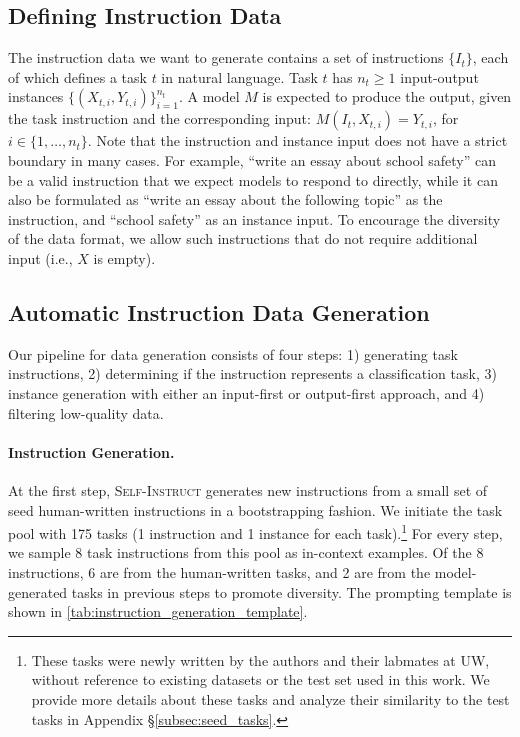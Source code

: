 \documentclass[11pt]{article}
\newcommand{\name}{\textsc{Self-Instruct}}
\begin{document}
\subsection{Defining Instruction Data}
\label{subsec:instruction-data-definition}

The instruction data we want to generate contains a set of instructions $\{I_t\}$, each of which defines a task $t$ in natural language. Task $t$ has $n_t \ge 1$ input-output instances $\{(X_{t,i}, Y_{t,i})\}_{i=1}^{n_t}$.
A model $M$ is expected to produce the output, given the task instruction and the corresponding input: $M(I_t, X_{t,i}) = Y_{t,i}$, for $i \in \{1,\ldots,n_t\}$.
Note that the instruction and instance input does not have a strict boundary in many cases. For example, ``write an essay about school safety'' can be a valid instruction that we expect models to respond to directly, while it can also be formulated as ``write an essay about the following topic'' as the instruction, and ``school safety'' as an instance input. To encourage the diversity of the data format, we allow such instructions that do not require additional input (i.e., $X$ is empty).

\subsection{Automatic Instruction Data Generation}
\label{subsec:data-generation}

Our pipeline for data generation consists of 
four steps: 1) generating task instructions, 2) 
determining if the instruction represents a classification task,
3) instance generation with either an input-first or output-first approach, and 4) filtering low-quality data.

\paragraph{Instruction Generation.}
At the first step, \name{} generates new instructions from a small set of seed human-written instructions in a bootstrapping fashion. We initiate the task pool with 175 tasks (1 instruction and 1 instance for each task).\footnote{These tasks were newly written by the authors and their labmates at UW, without reference to existing datasets or the test set used in this work. We provide more details about these tasks and analyze their similarity to the test tasks in Appendix \S\ref{subsec:seed_tasks}.} For every step, we sample 8 task instructions from this pool as in-context examples. 
Of the 8 instructions, 6 are from the human-written tasks,
and 2 are from the model-generated tasks in previous steps to promote diversity. 
The prompting template is shown in \autoref{tab:instruction_generation_template}.
\end{document}
